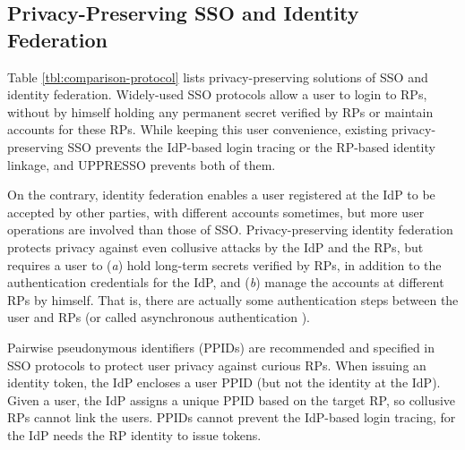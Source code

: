 

\subsection{Privacy-Preserving SSO and Identity Federation}
\label{subsec-solutions}
Table \ref{tbl:comparison-protocol} lists privacy-preserving solutions of SSO and identity federation.
Widely-used SSO protocols \cite{OpenIDConnect,rfc6749,SAML,SAMLIdentifier} allow a user to login to RPs,
        without by himself holding any permanent secret verified by RPs
        or maintain accounts for these RPs.
While keeping this user convenience,
 existing privacy-preserving SSO \cite{BrowserID,SPRESSO,NIST2017draft} prevents the IdP-based login tracing or the RP-based identity linkage,
    and UPPRESSO prevents both of them.

On the contrary, identity federation enables a user registered at the IdP to be accepted by other parties,
            with different accounts sometimes,
        but more user operations are involved than those of SSO.
Privacy-preserving identity federation \cite{ELPASSO,UnlimitID,hyperledge-idemix,PseudoID,Opaak}
    protects privacy against even collusive attacks by the IdP and the RPs,
    but requires a user to (\emph{a}) hold long-term secrets verified by RPs,
            in addition to the authentication credentials for the IdP,
                and (\emph{b}) manage the accounts at different RPs by himself.
That is, there are actually some authentication steps between the user and RPs (or called asynchronous authentication \cite{ELPASSO}).


Pairwise pseudonymous identifiers (PPIDs) are recommended \cite{NIST2017draft}
 and specified in SSO protocols \cite{OpenIDConnect, SAMLIdentifier} to protect user privacy against curious RPs.
When issuing an identity token,
        the IdP encloses a user PPID (but not the identity at the IdP).
Given a user,
    the IdP assigns a unique PPID based on the target RP,
    so collusive RPs cannot link the users.
PPIDs cannot prevent the IdP-based login tracing,
 for the IdP needs the RP identity to issue tokens.



